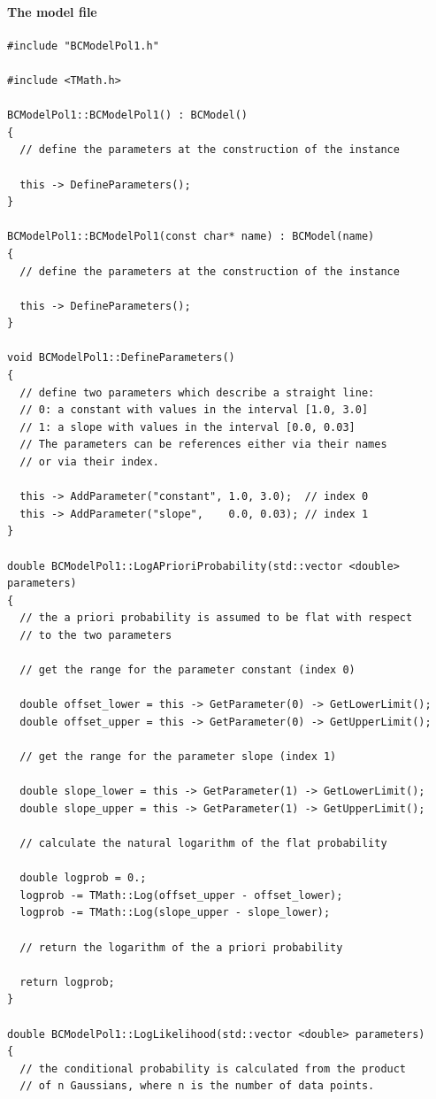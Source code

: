 \documentclass[11pt, a4paper]{article}
\begin{document}
\paragraph{The model file} 
% 
\begin{small} 
\begin{verbatim}
#include "BCModelPol1.h" 

#include <TMath.h> 

BCModelPol1::BCModelPol1() : BCModel()
{
  // define the parameters at the construction of the instance 

  this -> DefineParameters();
}

BCModelPol1::BCModelPol1(const char* name) : BCModel(name)
{
  // define the parameters at the construction of the instance 

  this -> DefineParameters();
}

void BCModelPol1::DefineParameters()
{
  // define two parameters which describe a straight line: 
  // 0: a constant with values in the interval [1.0, 3.0] 
  // 1: a slope with values in the interval [0.0, 0.03]
  // The parameters can be references either via their names 
  // or via their index. 

  this -> AddParameter("constant", 1.0, 3.0);  // index 0
  this -> AddParameter("slope",    0.0, 0.03); // index 1
}

double BCModelPol1::LogAPrioriProbability(std::vector <double> parameters)
{
  // the a priori probability is assumed to be flat with respect 
  // to the two parameters 

  // get the range for the parameter constant (index 0) 

  double offset_lower = this -> GetParameter(0) -> GetLowerLimit();
  double offset_upper = this -> GetParameter(0) -> GetUpperLimit();

  // get the range for the parameter slope (index 1) 

  double slope_lower = this -> GetParameter(1) -> GetLowerLimit();
  double slope_upper = this -> GetParameter(1) -> GetUpperLimit();

  // calculate the natural logarithm of the flat probability

  double logprob = 0.;
  logprob -= TMath::Log(offset_upper - offset_lower);
  logprob -= TMath::Log(slope_upper - slope_lower);

  // return the logarithm of the a priori probability 

  return logprob;
}

double BCModelPol1::LogLikelihood(std::vector <double> parameters)
{
  // the conditional probability is calculated from the product 
  // of n Gaussians, where n is the number of data points. 


\end{verbatim}
\end{small}
\end{document}
